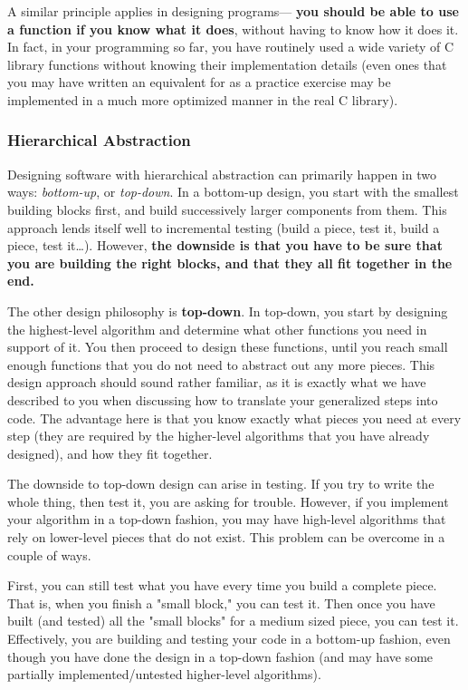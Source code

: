 \documentclass[11pt, a4paper]{article}
\begin{document}
A similar principle applies in designing programs— \textbf{you should be able to use a function if you know what it does}, without having to know how it does it. In fact, in your programming so far, you have routinely used a wide variety of C library functions without knowing their implementation details (even ones that you may have written an equivalent for as a practice exercise may be implemented in a much more optimized manner in the real C library).

\subsubsection{Hierarchical Abstraction}%
\label{ssub:hierarchical_abstraction}


Designing software with hierarchical abstraction can primarily happen in two ways: \textit{bottom-up}, or \textit{top-down}. In a bottom-up design, you start with the smallest building blocks first, and build successively larger components from them. This approach lends itself well to incremental testing (build a piece, test it, build a piece, test it…). However, \textbf{the downside is that you have to be sure that you are building the right blocks, and that they all fit together in the end.}


The other design philosophy is \textbf{top-down}. In top-down, you start by designing the highest-level algorithm and determine what other functions you need in support of it. You then proceed to design these functions, until you reach small enough functions that you do not need to abstract out any more pieces. This design approach should sound rather familiar, as it is exactly what we have described to you when discussing how to translate your generalized steps into code. The advantage here is that you know exactly what pieces you need at every step (they are required by the higher-level algorithms that you have already designed), and how they fit together.

The downside to top-down design can arise in testing. If you try to write the whole thing, then test it, you are asking for trouble. However, if you implement your algorithm in a top-down fashion, you may have high-level algorithms that rely on lower-level pieces that do not exist. This problem can be overcome in a couple of ways.

First, you can still test what you have every time you build a complete piece. That is, when you finish a "small block," you can test it. Then once you have built (and tested) all the "small blocks" for a medium sized piece, you can test it. Effectively, you are building and testing your code in a bottom-up fashion, even though you have done the design in a top-down fashion (and may have some partially implemented/untested higher-level algorithms).
\end{document}
